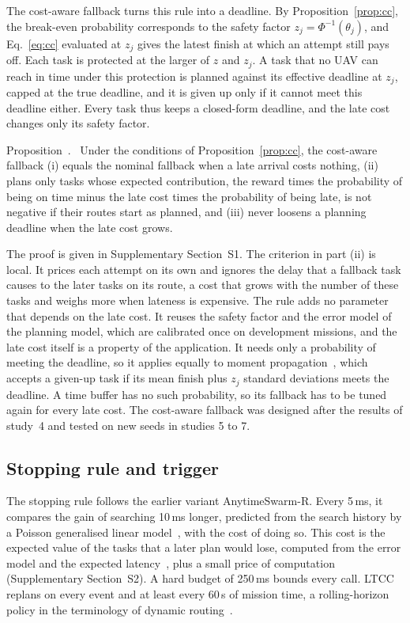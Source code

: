 \documentclass[a4paper,fleqn]{cas-dc}
\newcommand{\mname}{LTCC}  %
\newcounter{prop}
\newenvironment{prop}{\par\smallskip\refstepcounter{prop}\noindent Proposition~\theprop.\ }{\par\smallskip}
\begin{document}
The cost-aware fallback turns this rule into a deadline. By Proposition~\ref{prop:cc}, the break-even probability
corresponds to the safety factor $z_j=\Phi^{-1}(\theta_j)$, and Eq.~\eqref{eq:cc} evaluated at $z_j$ gives the latest
finish at which an attempt still pays off. Each task is protected at the larger of $z$ and $z_j$. A task that no UAV can
reach in time under this protection is planned against its effective deadline at $z_j$, capped at the true deadline,
and it is given up only if it cannot meet this deadline either. Every task thus keeps a closed-form deadline, and the
late cost changes only its safety factor.

\begin{prop}\label{prop:costfb}
Under the conditions of Proposition~\ref{prop:cc}, the cost-aware fallback (i) equals the nominal fallback when a late
arrival costs nothing, (ii) plans only tasks whose expected contribution, the reward times the probability of being on
time minus the late cost times the probability of being late, is not negative if their routes start as planned, and
(iii) never loosens a planning deadline when the late cost grows.
\end{prop}

The proof is given in Supplementary Section~S1. The criterion in part (ii) is local. It prices each
attempt on its own and ignores the delay that a fallback task causes to the later tasks on its route, a cost that grows
with the number of these tasks and weighs more when lateness is expensive. The rule adds no parameter that depends on
the late cost. It reuses the safety factor and the error model of the planning model, which are calibrated once on
development missions, and the late cost itself is a property of the application. It needs only a probability
of meeting the deadline, so it applies equally to moment propagation~\cite{ehmke2015ensuring}, which accepts a given-up
task if its mean finish plus $z_j$ standard deviations meets the deadline. A time buffer has no such probability, so its
fallback has to be tuned again for every late cost. The cost-aware fallback was designed after the results of study~4
and tested on new seeds in studies 5 to 7.

\subsection{Stopping rule and trigger}\label{sec:stop}
The stopping rule follows the earlier variant AnytimeSwarm-R. Every 5\,ms, it compares the gain of searching 10\,ms
longer, predicted from the search history by a Poisson generalised linear model~\cite{mccullagh1989glm}, with the cost
of doing so. This cost is the expected value of the tasks that a later plan would lose, computed from the error model
and the expected latency~\cite{savelsbergh1992vrptw}, plus a small price of computation (Supplementary
Section~S2). A hard budget of 250\,ms bounds every call. \mname{} replans on every event and at least
every 60\,s of mission time, a rolling-horizon policy in the terminology of dynamic routing~\cite{soeffker2022review}.
\end{document}
